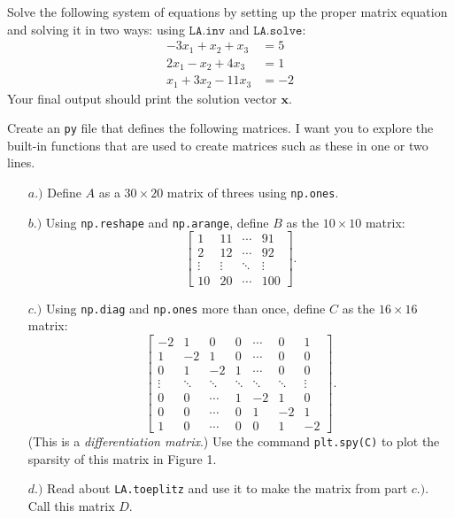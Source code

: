 \documentclass[10pt]{article}
\begin{document}
\begin{enumerate}[{$\qquad 1.]$}]
\item Solve the following system of equations by setting up the proper matrix equation and solving it in two ways: using $\texttt{LA.inv}$ and $\texttt{LA.solve}$: 
\begin{align*}
-3x_1 + x_2 + x_3 & = 5 \\
2x_1 - x_2 + 4x_3 & = 1\\
x_1 + 3x_2 - 11x_3 & = -2 \end{align*}
Your final output should print the solution vector $\boldsymbol{x}$.  


\item Create an \texttt{py} file that defines the following matrices.  I want you to explore the built-in functions that are used to create matrices such as these in one or two lines. 
\begin{enumerate}
\item[$a.)$] Define $A$ as a $30\times 20$ matrix of threes using \texttt{np.ones}.
\item[$b.)$] Using \texttt{np.reshape} and \texttt{np.arange}, define $B$ as the $10 \times 10$ matrix:
\[\displaystyle \begin{bmatrix} 1 & 11 & \cdots & 91 \\ 2 & 12 & \cdots & 92 \\ 
\vdots & \vdots & \ddots & \vdots \\
10 & 20 & \cdots & 100\end{bmatrix}.\]
\item[$c.)$] Using \texttt{np.diag} and \texttt{np.ones} more than once, define $C$ as the $16\times 16$ matrix: 
\[\displaystyle \begin{bmatrix} -2 & 1 & 0 & 0 &  \cdots & 0 & 1 \\ 
1 & -2 & 1 & 0 & \cdots & 0 & 0 \\ 
0 & 1 & -2 & 1  & \cdots & 0 & 0 \\ 
\vdots & \ddots &  \ddots & \ddots &  \ddots & \ddots & \vdots \\
0 & 0  & \cdots & 1& -2 & 1 & 0\\
0 & 0  & \cdots & 0&  1& -2 & 1\\
1 & 0  & \cdots & 0 & 0  &1& -2 \end{bmatrix}.\]
(This is a \textit{differentiation matrix}.) Use the command \texttt{plt.spy(C)} to plot the sparsity of this matrix in Figure 1. 

\item[$d.)$] Read about \texttt{LA.toeplitz} and use it to make the matrix from part $c.)$.  Call this matrix $D$.


\end{enumerate}
\end{enumerate}
\end{document}
